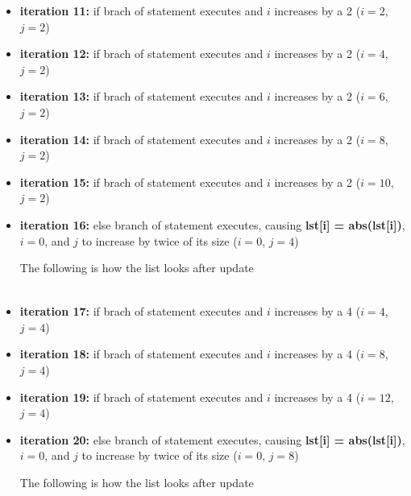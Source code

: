 \documentclass[12pt]{article}
\begin{document}
\begin{enumerate}[a.]
\begin{itemize}
\begin{itemize}
            \item \textbf{iteration 11:} if brach of statement executes and $i$ increases
            by a 2 ($i = 2$, $j = 2$)
            \item \textbf{iteration 12:} if brach of statement executes and $i$ increases
            by a 2 ($i = 4$, $j = 2$)
            \item \textbf{iteration 13:} if brach of statement executes and $i$ increases
            by a 2 ($i = 6$, $j = 2$)
            \item \textbf{iteration 14:} if brach of statement executes and $i$ increases
            by a 2 ($i = 8$, $j = 2$)
            \item \textbf{iteration 15:} if brach of statement executes and $i$ increases
            by a 2 ($i = 10$, $j = 2$)
            \item \textbf{iteration 16:} else branch of statement executes, causing
            \textbf{lst[i] = abs(lst[i])}, $i = 0$, and $j$ to increase by twice of its size ($i = 0$, $j = 4$)

            \bigskip

            The following is how the list looks after update

            \begin{align*}
                [0,0,0,0,0,0,0,0,1,1,-1,-1,-1,-1,-1,-1]
            \end{align*}

            \item \textbf{iteration 17:} if brach of statement executes and $i$ increases
            by a 4 ($i = 4$, $j = 4$)
            \item \textbf{iteration 18:} if brach of statement executes and $i$ increases
            by a 4 ($i = 8$, $j = 4$)
            \item \textbf{iteration 19:} if brach of statement executes and $i$ increases
            by a 4 ($i = 12$, $j = 4$)
            \item \textbf{iteration 20:} else branch of statement executes, causing
            \textbf{lst[i] = abs(lst[i])}, $i = 0$, and $j$ to increase by twice of its size ($i = 0$, $j = 8$)

            \bigskip

            The following is how the list looks after update

            \begin{align*}
                [0,0,0,0,0,0,0,0,1,1,-1,1,-1,-1,-1,-1]
            \end{align*}


\end{itemize}
\end{itemize}
\end{enumerate}
\end{document}
